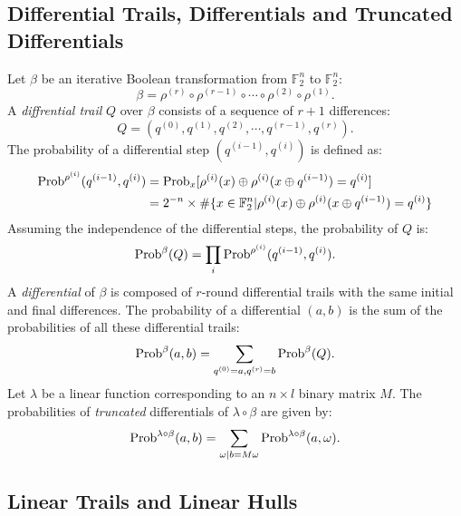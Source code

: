 
\subsection{Differential Trails, Differentials and Truncated Differentials \cite{DR02}}

Let $\beta$ be an iterative Boolean transformation from $\mathbb{F}_2^n$ to $\mathbb{F}_2^n$: 
\[
    \beta=\rho^{(r)}\circ\rho^{(r-1)}\circ\cdots\circ\rho^{(2)}\circ\rho^{(1)}.
\]
A \textit{diffrential trail} $Q$ over $\beta$ consists of a sequence of $r+1$ differences:
\[
    Q=(q^{(0)},q^{(1)},q^{(2)},\cdots,q^{(r-1)},q^{(r)}).
\]
The probability of a differential step $(q^{(i-1)},q^{(i)})$ is defined as:
\begin{align*}
    \text{Prob}^{\rho^{(i)}}(q^{(i-1)},q^{(i)})&=\text{Prob}_x[\rho^{(i)}(x)\oplus\rho^{(i)}(x\oplus q^{(i-1)})=q^{(i)}]\\
    &=2^{-n}\times\#\{x\in \mathbb{F}_2^n|\rho^{(i)}(x)\oplus\rho^{(i)}(x\oplus q^{(i-1)})=q^{(i)}\}
\end{align*}
Assuming the independence of the differential steps, the probability of $Q$ is:
\[
    \text{Prob}^{\beta}(Q)=\prod\limits_i\text{Prob}^{\rho^{(i)}}(q^{(i-1)},q^{(i)}).
\]
A \textit{differential} of $\beta$ is composed of $r$-round differential trails with the same initial and final differences. The probability of a differential $(a,b)$ is the sum of the probabilities of all these differential trails:
\[
    \text{Prob}^{\beta}(a,b)=\sum\limits_{q^{(0)}=a,q^{(r)}=b}\text{Prob}^{\beta}(Q).
\]
Let $\lambda$ be a linear function corresponding to an $n\times l$ binary matrix $M$. The probabilities of \textit{truncated} differentials of $\lambda\circ\beta$ are given by:
\[
    \text{Prob}^{\lambda\circ\beta}(a,b)=\sum\limits_{\omega|b=M\omega}\text{Prob}^{\lambda\circ\beta}(a,\omega).
\]

\subsection{Linear Trails and Linear Hulls \cite{DR02}}

